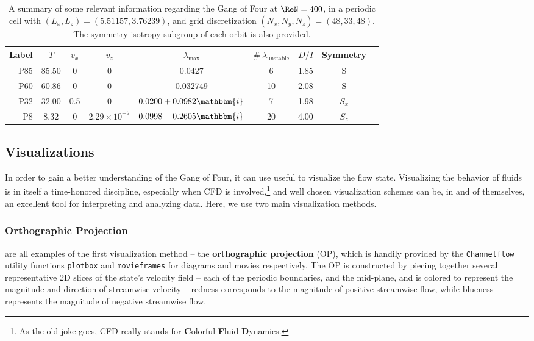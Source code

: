 \begin{table}[h!]
\caption{A summary of some relevant information regarding the Gang of Four at $\ReN = 400$, in a periodic cell with $(L_x,L_z) = (5.51157, 3.76239)$, and grid discretization $(N_x,N_y,N_z)= (48,33,48)$. The symmetry isotropy subgroup of each orbit is also provided.}\label{tab:summary}
\begin{center}
\begin{tabular}{r   c  c  c  c  c  c  c  l }
\toprule
Label & $T$ & $v_x$ & $v_z$ &  $\lambda_{\textrm{max}}$ & $\#\ \lambda_{\textrm{unstable}}$ & $\bar{D}/\bar{I}$&  Symmetry \\
\midrule
\midrule
P85 & 85.50 & 0 & 0 & 0.0427 & 6 &1.85 & S\\
P60 & 60.86 & 0 & 0 &  0.032749 & 10 & 2.08 & S\\
P32 & 32.00 & 0.5 & 0 &  $0.0200 + 0.0982 \mathbbm{i}$ & 7& 1.98 &$S_x$\\
P8 & 8.32 & 0 & $2.29\times 10^{-7}$ & $0.0998 - 0.2605 \mathbbm{i}$ &20& 4.00& $S_z$\\
\bottomrule
\end{tabular}
\end{center}
\end{table}

\subsection{Visualizations}   
In order to gain a better understanding of the Gang of Four, it can use useful to visualize the flow state. Visualizing the behavior of fluids is in itself a time-honored discipline, especially when CFD is involved,\footnote{As the old joke goes, CFD really stands for {\bf C}olorful {\bf F}luid {\bf D}ynamics.} and well chosen visualization schemes can be, in and of themselves, an excellent tool for interpreting and analyzing data. Here, we use two main visualization methods.
\subsubsection{Orthographic Projection}
 are all examples of the first visualization method -- the {\bf orthographic projection} (OP), which is handily provided by the {\tt Channelflow} utility functions {\tt plotbox} and {\tt movieframes} for diagrams and movies respectively. The OP is constructed by piecing together several representative 2D slices of the state's velocity field -- each of the periodic boundaries, and the mid-plane, and is colored to represent the magnitude and direction of streamwise velocity -- redness corresponds to the magnitude of positive streamwise flow, while blueness represents the magnitude of negative streamwise flow.\\

